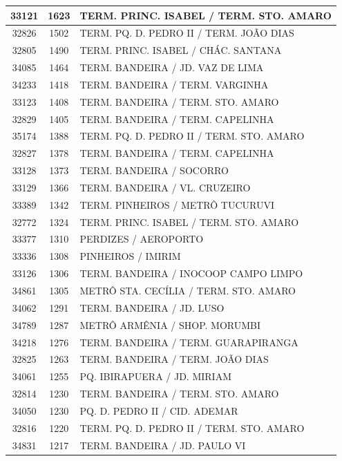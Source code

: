 \documentclass[
	12pt,				%
	oneside,			%
	a4paper,			%
	english,			%
	brazil				%
	]{abntex2ppgsi}
\begin{document}
{{\begin{apendicesenv}
\begin{longtable}{c|c|p{7cm}}
33121 &	1623 &	TERM. PRINC. ISABEL / TERM. STO. AMARO \\ 
 \hline 
32826 &	1502 &	TERM. PQ. D. PEDRO II / TERM. JOÃO DIAS \\ 
 \hline 
32805 &	1490 &	TERM. PRINC. ISABEL / CHÁC. SANTANA \\ 
 \hline 
34085 &	1464 &	TERM. BANDEIRA / JD. VAZ DE LIMA \\ 
 \hline 
34233 &	1418 &	TERM. BANDEIRA / TERM. VARGINHA \\ 
 \hline 
33123 &	1408 &	TERM. BANDEIRA / TERM. STO. AMARO \\ 
 \hline 
32829 &	1405 &	TERM. BANDEIRA / TERM. CAPELINHA \\ 
 \hline 
35174 &	1388 &	TERM. PQ. D. PEDRO II / TERM. STO. AMARO \\ 
 \hline 
32827 &	1378 &	TERM. BANDEIRA / TERM. CAPELINHA \\ 
 \hline 
33128 &	1373 &	TERM. BANDEIRA / SOCORRO \\ 
 \hline 
33129 &	1366 &	TERM. BANDEIRA / VL. CRUZEIRO \\ 
 \hline 
33389 &	1342 &	TERM. PINHEIROS / METRÔ TUCURUVI \\ 
 \hline 
32772 &	1324 &	TERM. PRINC. ISABEL / TERM. STO. AMARO \\ 
 \hline 
33377 &	1310 &	PERDIZES / AEROPORTO \\ 
 \hline 
33336 &	1308 &	PINHEIROS / IMIRIM \\ 
 \hline 
33126 &	1306 &	TERM. BANDEIRA / INOCOOP CAMPO LIMPO \\ 
 \hline 
34861 &	1305 &	METRÔ STA. CECÍLIA / TERM. STO. AMARO \\ 
 \hline 
34062 &	1291 &	TERM. BANDEIRA / JD. LUSO \\ 
 \hline 
34789 &	1287 &	METRÔ ARMÊNIA / SHOP. MORUMBI \\ 
 \hline 
34218 &	1276 &	TERM. BANDEIRA / TERM. GUARAPIRANGA \\ 
 \hline 
32825 &	1263 &	TERM. BANDEIRA / TERM. JOÃO DIAS \\ 
 \hline 
34061 &	1255 &	PQ. IBIRAPUERA / JD. MIRIAM \\ 
 \hline 
32814 &	1230 &	TERM. BANDEIRA / TERM. STO. AMARO \\ 
 \hline 
34050 &	1230 &	PQ. D. PEDRO II / CID. ADEMAR \\ 
 \hline 
32816 &	1220 &	TERM. PQ. D. PEDRO II / TERM. STO. AMARO \\ 
 \hline 
34831 &	1217 &	TERM. BANDEIRA / JD. PAULO VI \\ 

\end{longtable}
\end{apendicesenv}}}
\end{document}
